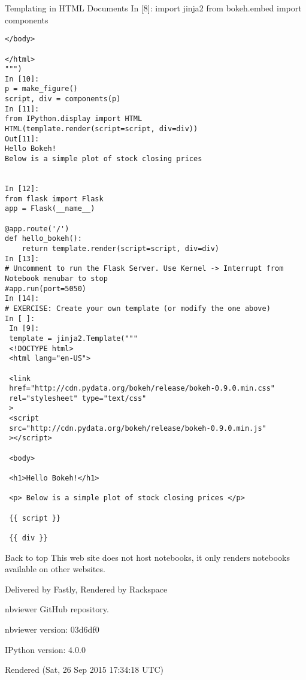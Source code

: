 Templating in HTML Documents
In [8]:
import jinja2
from bokeh.embed import components
\begin{verbatim}
</body>

</html>
""")
In [10]:
p = make_figure()
script, div = components(p)
In [11]:
from IPython.display import HTML
HTML(template.render(script=script, div=div))
Out[11]:
Hello Bokeh!
Below is a simple plot of stock closing prices

	
In [12]:
from flask import Flask
app = Flask(__name__)

@app.route('/')
def hello_bokeh():
    return template.render(script=script, div=div)
In [13]:
# Uncomment to run the Flask Server. Use Kernel -> Interrupt from Notebook menubar to stop 
#app.run(port=5050)
In [14]:
# EXERCISE: Create your own template (or modify the one above) 
In [ ]:
 In [9]:
 template = jinja2.Template("""
 <!DOCTYPE html>
 <html lang="en-US">
 
 <link
 href="http://cdn.pydata.org/bokeh/release/bokeh-0.9.0.min.css"
 rel="stylesheet" type="text/css"
 >
 <script 
 src="http://cdn.pydata.org/bokeh/release/bokeh-0.9.0.min.js"
 ></script>
 
 <body>
 
 <h1>Hello Bokeh!</h1>
 
 <p> Below is a simple plot of stock closing prices </p>
 
 {{ script }}
 
 {{ div }}
\end{verbatim}
Back to top
This web site does not host notebooks, it only renders notebooks available on other websites.

Delivered by Fastly, Rendered by Rackspace

nbviewer GitHub repository.

nbviewer version: 03d6df0

IPython version: 4.0.0

Rendered (Sat, 26 Sep 2015 17:34:18 UTC)
